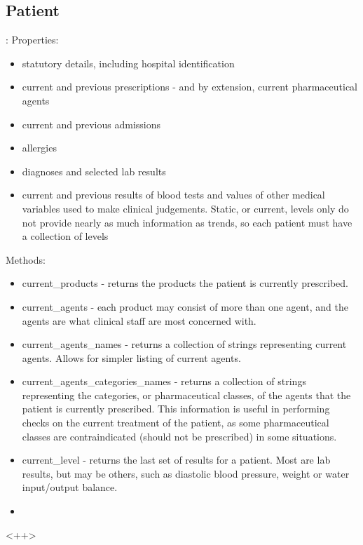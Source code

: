 \documentclass[letterpaper]{amsart}
\begin{document}
\paragraph{}
\subsection{Patient}:
Properties:
\begin{itemize}
    \item statutory details, including hospital identification
    \item current and previous prescriptions - and by extension, current pharmaceutical agents
    \item current and previous admissions
    \item allergies
    \item diagnoses and selected lab results 
    \item current and previous results of blood tests and values of other medical variables used to make clinical judgements.  Static, or current, levels only do not provide nearly as much information as trends, so each patient must have a collection of levels
\end{itemize}
Methods:
\begin{itemize}
    \item current\_products - returns the products the patient is currently prescribed. 
    \item current\_agents  - each product may consist of more than one agent, and the agents are what clinical staff are most concerned with.
    \item current\_agents\_names - returns a collection of strings representing current agents.  Allows for simpler listing of current agents. 
    \item current\_agents\_categories\_names - returns a collection of strings representing the categories, or pharmaceutical classes, of the agents that the patient is currently prescribed.  This information is useful in performing checks on the current treatment of the patient, as some pharmaceutical classes are contraindicated (should not be prescribed) in some situations. 
    \item current\_level - returns the last set of results for a patient.  Most are lab results, but may be others, such as diastolic blood pressure, weight or water input/output balance. 
    \item 
\end{itemize}<++>
\end{document}
